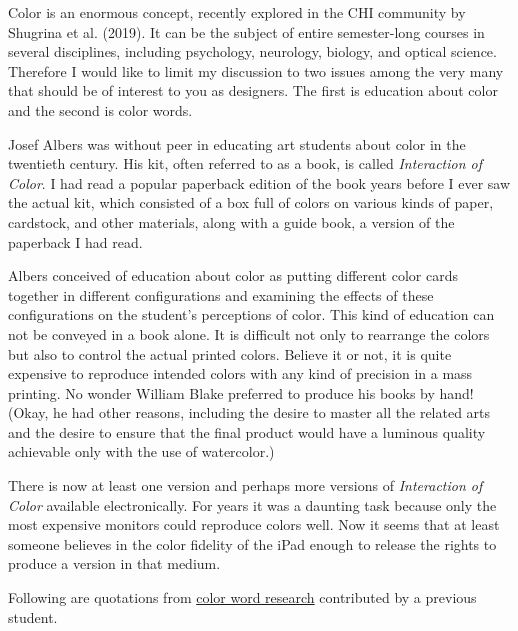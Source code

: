 \hypertarget{color}{%
\label{color}}

Color is an enormous concept, recently explored in the CHI community by
Shugrina et al. (2019). It can be the subject of entire semester-long
courses in several disciplines, including psychology, neurology,
biology, and optical science. Therefore I would like to limit my
discussion to two issues among the very many that should be of interest
to you as designers. The first is education about color and the second
is color words.

\hypertarget{education-about-color}{%
\label{education-about-color}}

Josef Albers was without peer in educating art students about color in
the twentieth century. His kit, often referred to as a book, is called
\emph{Interaction of Color}. I had read a popular paperback edition of
the book years before I ever saw the actual kit, which consisted of a
box full of colors on various kinds of paper, cardstock, and other
materials, along with a guide book, a version of the paperback I had
read.

Albers conceived of education about color as putting different color
cards together in different configurations and examining the effects of
these configurations on the student's perceptions of color. This kind of
education can not be conveyed in a book alone. It is difficult not only
to rearrange the colors but also to control the actual printed colors.
Believe it or not, it is quite expensive to reproduce intended colors
with any kind of precision in a mass printing. No wonder William Blake
preferred to produce his books by hand! (Okay, he had other reasons,
including the desire to master all the related arts and the desire to
ensure that the final product would have a luminous quality achievable
only with the use of watercolor.)

There is now at least one version and perhaps more versions of
\emph{Interaction of Color} available electronically. For years it was a
daunting task because only the most expensive monitors could reproduce
colors well. Now it seems that at least someone believes in the color
fidelity of the iPad enough to release the rights to produce a version
in that medium.

\hypertarget{color-word-research}{%
\label{color-word-research}}

Following are quotations from
\href{http://www.putlearningfirst.com/language/research/colour_words.html}{color
word research} contributed by a previous student.

